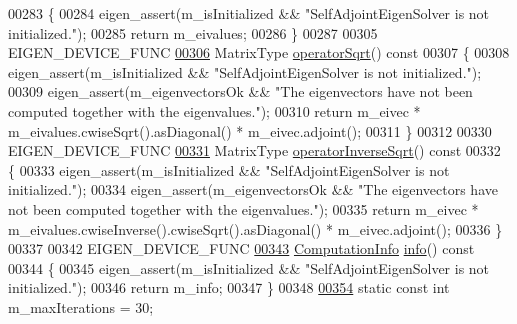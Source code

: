 \begin{DoxyCode}
00283 \textcolor{keyword}{    }\{
00284       eigen\_assert(m\_isInitialized && \textcolor{stringliteral}{"SelfAdjointEigenSolver is not initialized."});
00285       \textcolor{keywordflow}{return} m\_eivalues;
00286     \}
00287 
00305     EIGEN\_DEVICE\_FUNC
\hyperlink{group___eigenvalues___module_a5c5158fd86366081bdabec38112c2c8a}{00306}     MatrixType \hyperlink{group___eigenvalues___module_a5c5158fd86366081bdabec38112c2c8a}{operatorSqrt}()\textcolor{keyword}{ const}
00307 \textcolor{keyword}{    }\{
00308       eigen\_assert(m\_isInitialized && \textcolor{stringliteral}{"SelfAdjointEigenSolver is not initialized."});
00309       eigen\_assert(m\_eigenvectorsOk && \textcolor{stringliteral}{"The eigenvectors have not been computed together with the
       eigenvalues."});
00310       \textcolor{keywordflow}{return} m\_eivec * m\_eivalues.cwiseSqrt().asDiagonal() * m\_eivec.adjoint();
00311     \}
00312 
00330     EIGEN\_DEVICE\_FUNC
\hyperlink{group___eigenvalues___module_a71fe0aea0b22d176efcea556c5c160f5}{00331}     MatrixType \hyperlink{group___eigenvalues___module_a71fe0aea0b22d176efcea556c5c160f5}{operatorInverseSqrt}()\textcolor{keyword}{ const}
00332 \textcolor{keyword}{    }\{
00333       eigen\_assert(m\_isInitialized && \textcolor{stringliteral}{"SelfAdjointEigenSolver is not initialized."});
00334       eigen\_assert(m\_eigenvectorsOk && \textcolor{stringliteral}{"The eigenvectors have not been computed together with the
       eigenvalues."});
00335       \textcolor{keywordflow}{return} m\_eivec * m\_eivalues.cwiseInverse().cwiseSqrt().asDiagonal() * m\_eivec.adjoint();
00336     \}
00337 
00342     EIGEN\_DEVICE\_FUNC
\hyperlink{group___eigenvalues___module_a56bd59b85a6f6f00ff7bff307ad0e015}{00343}     \hyperlink{group__enums_ga85fad7b87587764e5cf6b513a9e0ee5e}{ComputationInfo} \hyperlink{group___eigenvalues___module_a56bd59b85a6f6f00ff7bff307ad0e015}{info}()\textcolor{keyword}{ const}
00344 \textcolor{keyword}{    }\{
00345       eigen\_assert(m\_isInitialized && \textcolor{stringliteral}{"SelfAdjointEigenSolver is not initialized."});
00346       \textcolor{keywordflow}{return} m\_info;
00347     \}
00348 
\hyperlink{group___eigenvalues___module_a0567341a66a61e2c8891f7cdd1e4505c}{00354}     \textcolor{keyword}{static} \textcolor{keyword}{const} \textcolor{keywordtype}{int} m\_maxIterations = 30;

\end{DoxyCode}
